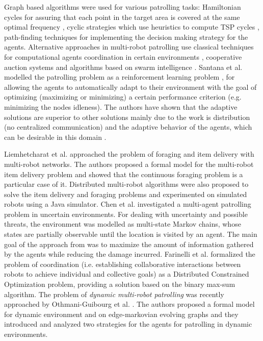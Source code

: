 Graph based algorithms were used for various patrolling tasks: Hamiltonian cycles for assuring that each point in the target area is covered at the same optimal frequency \cite{Elmaliach:2009}, cyclic strategies which use heuristics to compute TSP cycles \cite{Chevaleyre2004}, path-finding techniques for implementing the decision making strategy for the agents. %
Alternative approaches in multi-robot patrolling use classical techniques for computational agents coordination in certain environments \cite{portugal_2011},  cooperative auction systems \cite{Hwang_2009} and algorithms based on swarm intelligence \cite{chu_2007}. Santana et al. modelled the patrolling problem as a reinforcement learning problem \cite{Santana:2004}, for allowing the agents to automatically adapt to their environment with the goal of optimizing (maximizing or minimizing) a certain performance criterion (e.g. minimizing the nodes idleness). The authors have shown that the adaptive solutions are superior to other solutions mainly due to the work is distribution (no centralized communication) and the adaptive behavior of the agents, which can be desirable in this domain \cite{Santana:2004}.

Liemhetcharat et al. \cite{Liemhetcharat2015} approached the problem of foraging and item delivery with multi-robot networks. The authors proposed a formal model for the multi-robot item delivery problem and showed that the continuous foraging problem is a particular case of it. Distributed multi-robot algorithms were also proposed to solve the item delivery and foraging problems and experimented on simulated robots using a Java simulator. Chen et al.  \cite{Chen_2015} investigated  a multi-agent patrolling problem in uncertain environments. For dealing with uncertainty and possible threats, the environment was modelled as multi-state Markov chains, whose states are partially observable until the location is visited by an agent. The main goal of the approach from  \cite{Chen_2015} was to maximize the amount of information gathered by the agents while reducing the damage incurred.  Farinelli et al.  \cite{11} formalized the problem of coordination (i.e. establishing collaborative interactions between robots to achieve individual and collective goals) as a Distributed Constrained Optimization problem, providing a solution based on the binary max-sum algorithm. The problem of \emph{dynamic multi-robot patrolling} was recently approached by Othmani-Guibourg et al. \cite{othmaniguibourg18}. The authors proposed a formal model for dynamic environment and on edge-markovian evolving graphs and they introduced and analyzed two strategies for the agents for patrolling in dynamic environments. 



